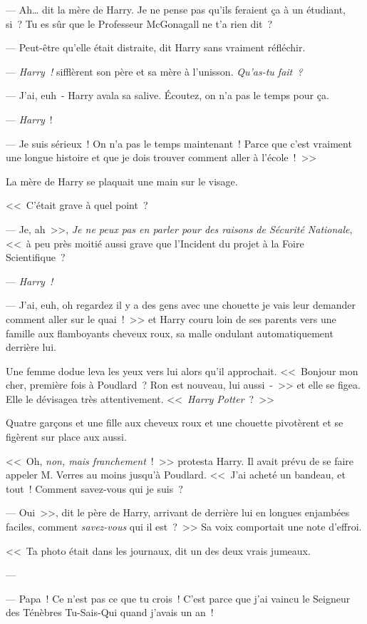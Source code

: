 --- Ah… dit la mère de Harry. Je ne pense pas qu'ils feraient ça à un étudiant, si~? Tu es sûr que le Professeur McGonagall ne t'a rien dit~?

--- Peut-être qu'elle était distraite, dit Harry sans vraiment réfléchir.

--- \emph{Harry~!} sifflèrent son père et sa mère à l'unisson. \emph{Qu'as-tu fait~?}

--- J'ai, euh~- Harry avala sa salive. Écoutez, on n'a pas le temps pour ça.

--- \emph{Harry}~!

--- Je suis sérieux~! On n'a pas le temps maintenant~! Parce que c'est vraiment une longue histoire et que je dois trouver comment aller à l'école~!~>>

La mère de Harry se plaquait une main sur le visage. 

<<~C'était grave à quel point~?

--- Je, ah~>>, \emph{Je ne peux pas en parler pour des raisons de Sécurité Nationale}, <<~à peu près moitié aussi grave que l'Incident du projet à la Foire Scientifique~?

--- \emph{Harry~!}

--- J'ai, euh, oh regardez il y a des gens avec une chouette je vais leur demander comment aller sur le quai~!~>> et Harry couru loin de ses parents vers une famille aux flamboyants cheveux roux, sa malle ondulant automatiquement derrière lui.

Une femme dodue leva les yeux vers lui alors qu'il approchait. <<~Bonjour mon cher, première fois à Poudlard~? Ron est nouveau, lui aussi~-~>> et elle se figea. Elle le dévisagea très attentivement. <<~\emph{Harry Potter}~?~>>

Quatre garçons et une fille aux cheveux roux et une chouette pivotèrent et se figèrent sur place aux aussi.

<<~Oh, \emph{non, mais franchement}~!~>> protesta Harry. Il avait prévu de se faire appeler M. Verres au moins jusqu'à Poudlard. <<~J'ai acheté un bandeau, et tout~! Comment savez-vous qui je suis~?

--- Oui~>>, dit le père de Harry, arrivant de derrière lui en longues enjambées faciles, comment \emph{savez-vous} qui il est~?~>> Sa voix comportait une note d'effroi.

<<~Ta photo était dans les journaux, dit un des deux vrais jumeaux.

--- 

--- Papa~! Ce n'est pas ce que tu crois~! C'est parce que j'ai vaincu le Seigneur des Ténèbres Tu-Sais-Qui quand j'avais un an~!

